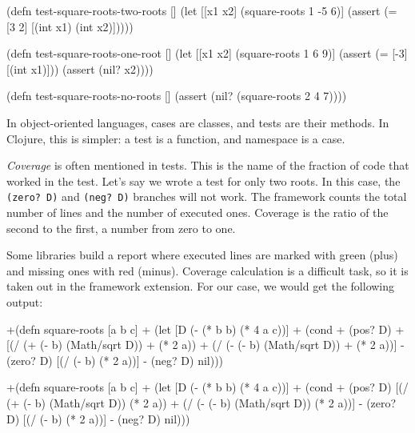 \else

\begin{english}
  \begin{clojure}
(defn test-square-roots-two-roots []
  (let [[x1 x2] (square-roots 1 -5 6)]
    (assert (= [3 2] [(int x1) (int x2)]))))

(defn test-square-roots-one-root []
  (let [[x1 x2] (square-roots 1 6 9)]
    (assert (= [-3] [(int x1)]))
    (assert (nil? x2))))

(defn test-square-roots-no-roots []
  (assert (nil? (square-roots 2 4 7))))
  \end{clojure}
\end{english}

\fi

In object-oriented languages, cases are classes, and tests are their methods. In Clojure, this is simpler: a test is a function, and namespace is a case.


\emph{Coverage} is often mentioned in tests. This is the name of the fraction of code that worked in the test. Let's say we wrote a test for only two roots. In this case, the \verb|(zero? D)| and \verb|(neg? D)| branches will not work. The framework counts the total number of lines and the number of executed ones. Coverage is the ratio of the second to the first, a number from zero to one.

Some libraries build a report where executed lines are marked with green (plus) and missing ones with red (minus). Coverage calculation is a difficult task, so it is taken out in the framework extension. For our case, we would get the following output:

\ifnarrow

\begin{english}
  \begin{diff}
+(defn square-roots [a b c]
+  (let [D (- (* b b) (* 4 a c))]
+    (cond
+      (pos? D)
+      [(/ (+ (- b) (Math/sqrt D))
+          (* 2 a))
+       (/ (- (- b) (Math/sqrt D))
+          (* 2 a))]
-      (zero? D) [(/ (- b) (* 2 a))]
-      (neg? D) nil)))
  \end{diff}
\end{english}

\else

\begin{english}
  \begin{diff}
+(defn square-roots [a b c]
+  (let [D (- (* b b) (* 4 a c))]
+    (cond
+      (pos? D) [(/ (+ (- b) (Math/sqrt D)) (* 2 a))
+                (/ (- (- b) (Math/sqrt D)) (* 2 a))]
-      (zero? D) [(/ (- b) (* 2 a))]
-      (neg? D) nil)))
  \end{diff}
\end{english}
\fi

